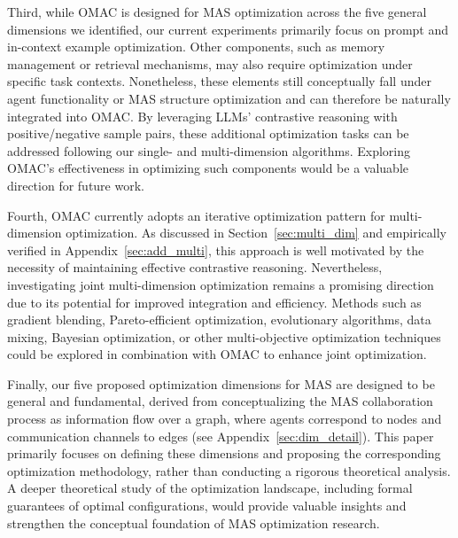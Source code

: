 Third, while OMAC is designed for MAS optimization across the five general dimensions we identified, our current experiments primarily focus on prompt and in-context example optimization. Other components, such as memory management or retrieval mechanisms, may also require optimization under specific task contexts. Nonetheless, these elements still conceptually fall under agent functionality or MAS structure optimization and can therefore be naturally integrated into OMAC. By leveraging LLMs’ contrastive reasoning with positive/negative sample pairs, these additional optimization tasks can be addressed following our single- and multi-dimension algorithms. Exploring OMAC’s effectiveness in optimizing such components would be a valuable direction for future work.

Fourth, OMAC currently adopts an iterative optimization pattern for multi-dimension optimization. As discussed in Section~\ref{sec:multi_dim} and empirically verified in Appendix~\ref{sec:add_multi}, this approach is well motivated by the necessity of maintaining effective contrastive reasoning. Nevertheless, investigating joint multi-dimension optimization remains a promising direction due to its potential for improved integration and efficiency. Methods such as gradient blending, Pareto-efficient optimization, evolutionary algorithms, data mixing, Bayesian optimization, or other multi-objective optimization techniques could be explored in combination with OMAC to enhance joint optimization.

Finally, our five proposed optimization dimensions for MAS are designed to be general and fundamental, derived from conceptualizing the MAS collaboration process as information flow over a graph, where agents correspond to nodes and communication channels to edges (see Appendix~\ref{sec:dim_detail}). This paper primarily focuses on defining these dimensions and proposing the corresponding optimization methodology, rather than conducting a rigorous theoretical analysis. A deeper theoretical study of the optimization landscape, including formal guarantees of optimal configurations, would provide valuable insights and strengthen the conceptual foundation of MAS optimization research.










\endinput



While OMAC is designed as a general framework for optimizing MAS in complex tasks, and empirical results have validated its effectiveness, we identify several additional directions worthy of exploration. 



